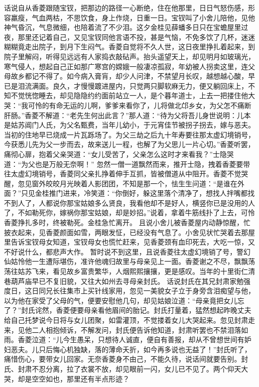 \documentclass[12pt,oneside]{book}
\begin{document}
话说自从香菱跟随宝钗，把那边的路径一心断绝，住在他那里，日日气怒伤感，形容羸瘦，气血两枯，不思饮食，身上作烧，日重一日。宝钗叫了小舍儿陪他，见他神气昏沉，气息微细，也陪着流了不少泪。这夕金桂见薛蟠多日只在宝蟾屋里过夜，那里还记着自己，又见宝钗同他言语不投，甚是气恼，不免多饮了几杯，迷迷糊糊竟走出院子，到月下生闷气。香菱自觉将不久人世，这日夜里挣扎着起来，到院子里解闷，听得见远远有人家捣衣敲砧声。抬头遥望天上，却见明月如玻璃光，寒气侵人，想起自己正如那广寒宫的嫦娥一般凄凉孤寂，年幼被人拐卖这里，连父母故乡都记不得了。如今病入膏肓，却少人问津，不禁望月长叹，越想越心酸，早已是泪流满面。良久，才慢慢踱进屋内，只觉两只脚软麻无力，便又躺回床上，不知不觉恍惚睡去，却见隐隐约约面前站立一人，是个暮年道士，上去一把搂住他大哭：“我可怜的有命无运的儿啊，爹爹来看你了，儿将做北邙乡女，为父怎不痛断肝肠。”香菱不解道：“老先生何出此言？”那人道：“待为父将吾儿身世说明：儿本是姑苏阊门人氏，为父名甄费，当年儿幼小，于元宵佳节被拐子拐去，嫁与恶夫。当初的住地早已烧成一片瓦跞场了。为父三劫之后九十年寿要往那太虚幻境销号，今获悉儿先为父一步而去，故来送儿一程，也解了为父思儿一片心切。”香菱听罢，痛彻心扉，抱着父亲哭道：“女儿受苦了，父亲怎么这时才来看我？”士隐哭道：“为父也是万般无奈啊！”
忽然一僧一道飘然而来，推开士隐，拽着香菱要带往太虚幻境销号，香菱同父亲扎挣着伸手互抓，皆被僧道从中阻开。香菱不觉哭醒，忽见窗外皎皎月光映着人影团团，不知是那一个，怯生生问道：“是谁在外面？”只见金桂推门进来，冷笑道：“你倒好，躲这里落个清净了，想找人拌嘴都找不到人了，人都说你那宝姑娘多么贤良，我看他却不是好人，横竖你已是没用的人了，不如勒死你，嫁祸你那宝姑娘，却是妙招。”说着，拿着牛筋线扑了上去，可怜香菱挣扎多时，终被勒死。金桂急忙离开。
且说小舍儿被香菱屋内动静惊醒，忙披衣起来，见香菱颜面如雪，两眼发怔，已经没有气息了。小舍见状忙哭着去那屋里告诉宝钗母女知道，宝钗母女也慌忙赶来，见香菱颈有血印死去，大吃一惊，又不好说什么，都悲声大作。
暂时说不到这里，且说香菱往太虚幻境销了号，警幻仙姑怜他一生遭际堪伤，准许他魂归故里与母亲见上一面。香菱谢之不尽，飘飘荡荡往姑苏飞来，看见故乡富贵繁华，人烟熙熙攘攘，更是感叹。当年的十里街仁清巷葫芦庙早已不复旧貌，又往大如州去寻母亲封氏。
话说封氏在其兄封肃家勉强度日，这日同兄长往集市上买针线家用，忽见一美貌女子立于身旁含泪痴望与他，以为他在家受了父母的气，便要安慰他几句，却见姑娘泣道：“母亲竟把女儿忘了？”封氏诧然，香菱便要母亲看他眉间的胎记。封氏打量着，猛然想起昨晚丈夫给自己托梦说今日将与女儿团聚，如雷灌顶，不觉搂着女儿大哭起来。忽见封肃走来，见他二人相抱倾诉，不解发问，封氏便告诉他知道，封肃听罢也不禁泪落如雨。香菱泣道：“儿今生愚呆，只想待人诚直，便自有善报，却从不曾想世间有妒妇恶夫。儿只后悔心机独缺，落的薄命夭折，如今再多说也无益了！”封氏听了，痛惜伤心，要带女儿回家。无奈香菱身不由己，不能久待，说话间就要告别。封氏、封肃不忍分离，拉了衣裳不放，却见眼前一闪，女儿已不见了。两个仰天大哭，却是空空如也，那里还有半点形迹？
\end{document}
